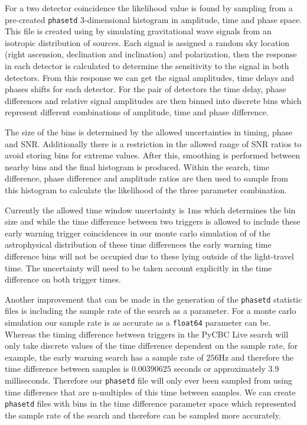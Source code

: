 For a two detector coincidence the likelihood value is found by sampling from a pre-created \verb|phasetd| 3-dimensional histogram in amplitude, time and phase space. This file is created using by simulating gravitational wave signals from an isotropic distribution of sources. Each signal is assigned a random sky location (right ascension, declination and inclination) and polarization, then the response in each detector is calculated to determine the sensitivity to the signal in both detectors. From this response we can get the signal amplitudes, time delays and phases shifts for each detector. For the pair of detectors the time delay, phase differences and relative signal amplitudes are then binned into discrete bins which represent different combinations of amplitude, time and phase difference.

The size of the bins is determined by the allowed uncertainties in timing, phase and SNR. Additionally there is a restriction in the allowed range of SNR ratios to avoid storing bins for extreme values. After this, smoothing is performed between nearby bins and the final histogram is produced. Within the search, time difference, phase difference and amplitude ratios are then used to sample from this histogram to calculate the likelihood of the three parameter combination.

Currently the allowed time window uncertainty is $1$ms which determines the bin size and while the time difference between two triggers is allowed to include these early warning trigger coincidences in our monte carlo simulation of of the astrophysical distribution of these time differences the early warning time difference bins will not be occupied due to these lying outside of the light-travel time. The uncertainty will need to be taken account explicitly in the time difference on both trigger times.

Another improvement that can be made in the generation of the \verb|phasetd| statistic files is including the sample rate of the search as a parameter. For a monte carlo simulation our sample rate is as accurate as a \verb|float64| parameter can be. Whereas the timing difference between triggers in the PyCBC Live search will only take discrete values of the time difference dependent on the sample rate, for example, the early warning search has a sample rate of $256$Hz and therefore the time difference between samples is $0.00390625$ seconds or approximately $3.9$ milliseconds. Therefore our \verb|phasetd| file will only ever been sampled from using time difference that are n-multiples of this time between samples. We can create \verb|phasetd| files with bins in the time difference parameter space which represented the sample rate of the search and therefore can be sampled more accurately.

